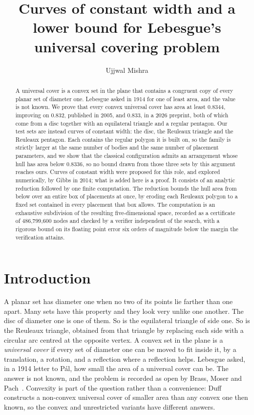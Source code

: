 \documentclass[a4paper,UKenglish,cleveref,autoref,thm-restate,numberwithinsect]{lipics-v2021}
\title{Curves of constant width and a lower bound for Lebesgue's universal
covering problem}
\author{Ujjwal Mishra}{Indian Institute of Information Technology Una, India}
       {ujjwalmishra238@gmail.com}{}{}
\begin{document}
\maketitle

\begin{abstract}
  A universal cover is a convex set in the plane that contains a congruent copy of
  every planar set of diameter one. Lebesgue asked in 1914 for one of least area,
  and the value is not known. We prove that every convex universal cover has area
  at least 0.8344, improving on 0.832, published in 2005, and 0.833, in a 2026
  preprint, both of which come from a disc together with an equilateral triangle
  and a regular pentagon. Our test sets are instead curves of constant width: the
  disc, the Reuleaux triangle and the Reuleaux pentagon. Each contains the regular
  polygon it is built on, so the family is strictly larger at the same number of
  bodies and the same number of placement parameters, and we show that the
  classical configuration admits an arrangement whose hull has area below 0.8336,
  so no bound drawn from those three sets by this argument reaches ours. Curves of
  constant width were proposed for this role, and explored numerically, by Gibbs
  in 2014; what is added here is a proof. It consists of an analytic reduction
  followed by one finite computation. The reduction bounds the hull area from
  below over an entire box of placements at once, by eroding each Reuleaux polygon
  to a fixed set contained in every placement that box allows. The computation is
  an exhaustive subdivision of the resulting five-dimensional space, recorded as a
  certificate of 486,799,600 nodes and checked by a verifier independent of the
  search, with a rigorous bound on its floating point error six orders of
  magnitude below the margin the verification attains.
\end{abstract}

\section{Introduction}
\label{sec:intro}

A planar set has diameter one when no two of its points lie farther than one
apart. Many sets have this property and they look very unlike one another. The
disc of diameter one is one of them. So is the equilateral triangle of side one.
So is the Reuleaux triangle, obtained from that triangle by replacing each side
with a circular arc centred at the opposite vertex. A convex set in the plane is
a \emph{universal cover} if every set of diameter one can be moved to fit inside
it, by a translation, a rotation, and a reflection where a reflection helps.
Lebesgue asked, in a 1914 letter to P\'al, how small the area of a universal
cover can be. The answer is not known, and the problem is recorded as open by
Brass, Moser and Pach~\cite{BrassMoserPach2005}. Convexity is part of the
question rather than a convenience: Duff~\cite{Duff1980} constructs a non-convex
universal cover of smaller area than any convex one then known, so the convex and
unrestricted variants have different answers.
\end{document}

